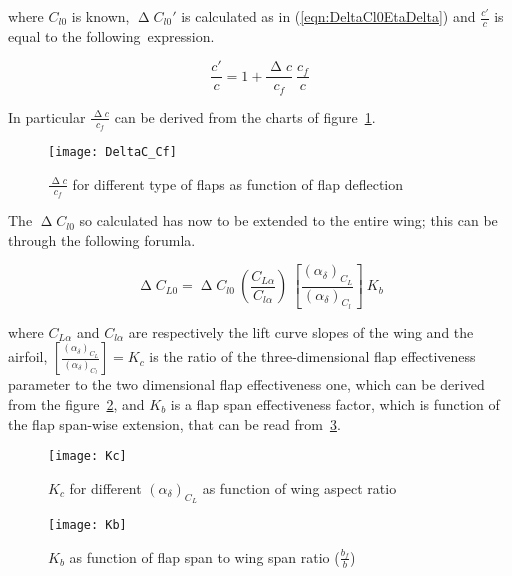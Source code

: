 where $C_{l0}$ is known, $\upDelta C_{l0}'$ is calculated as in (\ref{eqn:DeltaCl0EtaDelta}) and $\frac{c'}{c}$ is equal to the following~expression.

\begin{equation}
\frac{c'}{c}=1+\frac{\upDelta c}{c_f}\ \frac{c_f}{c}
\label{eqn:c'/c}
\end{equation}

\noindent
In particular $\frac{\upDelta c}{c_f}$ can be derived from the charts of figure~\ref{fig:DeltaCCf}.

\begin{figure}[!t]
  \centering
  \texttt{[image: DeltaC\_Cf]}
  \caption{$\frac{\upDelta c}{c_f}$ for different type of flaps as function of flap deflection}
  \label{fig:DeltaCCf}
\end{figure}

\noindent
The $\upDelta C_{l0}$ so calculated has now to be extended to the entire wing; this can be through the following forumla.

\begin{equation}
\upDelta C_{L0}=\upDelta C_{l0}\ \left(\frac{C_{L\alpha}}{C_{l\alpha}}\right)\ \left[\frac{\left(\alpha_\delta\right)_{C_{L}}}{\left(\alpha_\delta\right)_{C_{l}}}\right]\ K_b
\label{eqn:c'/c}
\end{equation}

\noindent
where $C_{L\alpha}$ and $C_{l\alpha}$ are respectively the lift curve slopes of the wing and the airfoil, $\left[\frac{\left(\alpha_\delta\right)_{C_{L}}}{\left(\alpha_\delta\right)_{C_{l}}}\right]=K_c$ is the ratio of the three-dimensional flap effectiveness parameter to the two dimensional flap effectiveness one, which can be derived from the figure~\ref{fig:Kc}, and $K_b$ is a flap span effectiveness factor, which is function of the flap span-wise extension, that can be  read from~\ref{fig:Kb}.

\begin{figure}[!b]
  \centering
  \texttt{[image: Kc]}
  \caption{$K_c$ for different $\left(\alpha_\delta\right)_{C_{L}}$ as function of wing aspect ratio}
  \label{fig:Kc}
\end{figure}

\begin{figure}[!t]
  \centering
  \texttt{[image: Kb]}
  \caption{$K_b$ as function of flap span to wing span ratio ($\frac{b_f}{b}$)}
  \label{fig:Kb}
\end{figure}

